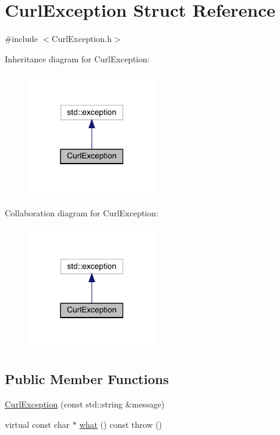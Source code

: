 \hypertarget{struct_curl_exception}{}\section{Curl\+Exception Struct Reference}
\label{struct_curl_exception}


{\ttfamily \#include $<$Curl\+Exception.\+h$>$}



Inheritance diagram for Curl\+Exception\+:
\nopagebreak
\begin{figure}[H]
\begin{center}
\leavevmode
\includegraphics[width=158pt]{struct_curl_exception__inherit__graph}
\end{center}
\end{figure}


Collaboration diagram for Curl\+Exception\+:
\nopagebreak
\begin{figure}[H]
\begin{center}
\leavevmode
\includegraphics[width=158pt]{struct_curl_exception__coll__graph}
\end{center}
\end{figure}
\subsection*{Public Member Functions}
\begin{DoxyCompactItemize}
\item 
\mbox{\hyperlink{struct_curl_exception_a90a114603f1009527490faa93207881e}{Curl\+Exception}} (const std\+::string \&message)
\item 
virtual const char $\ast$ \mbox{\hyperlink{struct_curl_exception_a14ac5b23a8cd9e134832d1dd76d78fc1}{what}} () const  throw ()
\end{DoxyCompactItemize}
